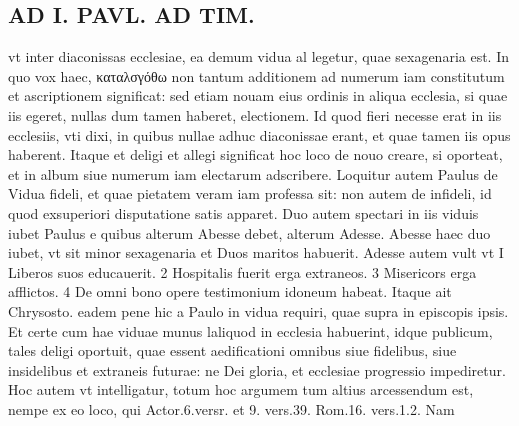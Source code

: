 \documentclass{article}
\begin{document}
\begin{pages}
\section*{AD I. PAVL. AD TIM. }
\marginpar{[ p.270 ]}\pstart vt inter diaconissas ecclesiae, ea demum vidua al legetur, quae sexagenaria est. In quo vox haec, καταλσγόθω non tantum additionem ad numerum iam constitutum et ascriptionem significat: sed etiam nouam eius ordinis in aliqua ecclesia, si quae iis egeret, nullas dum tamen haberet, electionem. Id quod fieri necesse erat in iis ecclesiis, vti dixi, in quibus nullae adhuc diaconissae erant, et quae tamen iis opus haberent. Itaque et deligi et allegi significat hoc loco de nouo creare, si oporteat, et in album siue numerum iam electarum adscribere. Loquitur autem Paulus de Vidua fideli, et quae pietatem veram iam professa sit: non autem de infideli, id quod exsuperiori disputatione satis apparet. Duo autem spectari in iis viduis iubet Paulus e quibus alterum Abesse debet, alterum Adesse. Abesse haec duo iubet, vt sit minor sexagenaria et Duos maritos habuerit. Adesse autem vult vt I Liberos suos educauerit. 2 Hospitalis fuerit erga extraneos. 3 Misericors erga afflictos. 4 De omni bono opere testimonium idoneum habeat. Itaque ait Chrysosto. eadem pene hic a Paulo in vidua requiri, quae supra in episcopis ipsis. Et certe cum hae viduae munus laliquod in ecclesia habuerint, idque publicum, tales deligi oportuit, quae essent aedificationi omnibus siue fidelibus, siue insidelibus et extraneis futurae: ne Dei gloria, et ecclesiae progressio impediretur. Hoc autem vt intelligatur, totum hoc argumem tum altius arcessendum est, nempe ex eo loco, qui Actor.6.versr. et 9. vers.39. Rom.16. vers.1.2. Nam  \pend

\end{pages}
\end{document}
